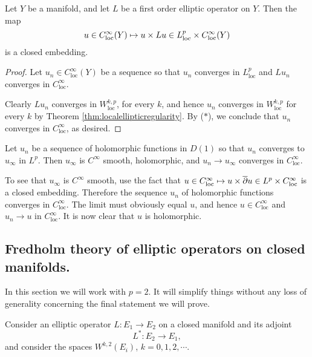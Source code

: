 \documentclass{amsart}
\begin{document}
 \begin{thm}
   Let $Y$ be a manifold, and let $L$ be a first order elliptic
   operator on $Y$. Then the map
   \begin{equation*}
     u\in C^{\infty}_{\text{loc}}(Y)\mapsto u\times Lu\in
     L^{p}_{\text{loc}}\times C^{\infty}_{\text{loc}}(Y)
   \end{equation*}
   is a closed embedding. 
 \end{thm}
 \begin{proof}
   Let $u_{n}\in C^{\infty}_{\text{loc}}(Y)$ be a sequence so that
   $u_{n}$ converges in $L^{p}_{\text{loc}}$ and $Lu_{n}$ converges in
   $C^{\infty}_{\text{loc}}$.

   Clearly $Lu_{n}$ converges in $W^{k,p}_{\text{loc}}$, for every
   $k$, and hence $u_{n}$ converges in $W^{k,p}_{\text{loc}}$ for
   every $k$ by Theorem \ref{thm:localellipticregularity}. By
   ($\ast$), we conclude that $u_{n}$ converges in
   $C^{\infty}_{\text{loc}}$, as desired.
 \end{proof}
 \begin{example}
   Let $u_{n}$ be a sequence of holomorphic functions in $D(1)$ so
   that $u_{n}$ converges to $u_{\infty}$ in $L^{p}$. Then
   $u_{\infty}$ is $C^{\infty}$ smooth, holomorphic, and $u_{n}\to
   u_{\infty}$ converges in $C^{\infty}_{\text{loc}}$.

   To see that $u_{\infty}$ is $C^{\infty}$ smooth, use the fact that
   $u\in C^{\infty}_{\text{loc}}\mapsto u\times \overline{\partial} u\in
   L^{p}\times C^{\infty}_{\text{loc}}$ is a closed
   embedding. Therefore the sequence $u_{n}$ of holomorphic functions
   converges in $C^{\infty}_{\text{loc}}$. The limit must obviously
   equal $u$, and hence $u\in C^{\infty}_{\text{loc}}$ and
   $u_{n}\to u$ in $C^{\infty}_{\text{loc}}$. It is now clear that $u$
   is holomorphic.
 \end{example}
  \subsection*{Fredholm theory of elliptic operators on closed
   manifolds.}
 In this section we will work with $p=2$. It will simplify things without
 any loss of generality concerning the final statement we will prove.

 Consider an elliptic operator $L:E_{1}\to E_{2}$ on a closed manifold
 and its adjoint $$L^{*}:E_{2}\to E_{1},$$ and consider the spaces
 $W^{k,2}(E_{i})$, $k=0,1,2,\cdots.$%
 
\end{document}
